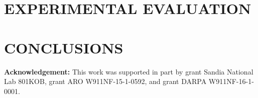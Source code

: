 \documentclass[letterpaper, 10 pt, conference]{ieeeconf}  %
\begin{document}
\section{EXPERIMENTAL EVALUATION}\label{sec:experiments}



\section{CONCLUSIONS}


\bigskip

{\bf Acknowledgement:} This work was supported in part by grant Sandia National Lab 801KOB, grant ARO W911NF-15-1-0592,  and grant DARPA W911NF-16-1-0001.








\end{document}

